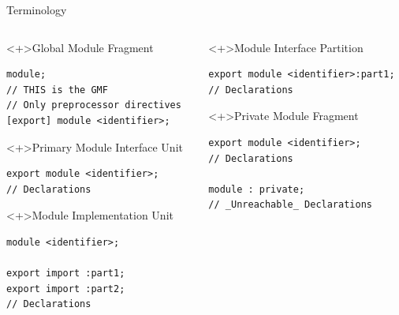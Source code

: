 \documentclass[aspectratio=169]{beamer}
\begin{document}

\begin{frame}[fragile]{Terminology}
  \begin{columns}
    \begin{column}{0.5\textwidth}

      \begin{block}<+>{\footnotesize Global Module Fragment}
        \begin{verbatim}
module;
// THIS is the GMF
// Only preprocessor directives
[export] module <identifier>;
    \end{verbatim}
      \end{block}

      \begin{block}<+>{\footnotesize Primary Module Interface Unit}
        \begin{verbatim}
export module <identifier>;
// Declarations
    \end{verbatim}
      \end{block}

      \begin{block}<+>{\footnotesize Module Implementation Unit}
        \begin{verbatim}
module <identifier>;

export import :part1;
export import :part2;
// Declarations
        \end{verbatim}
      \end{block}
    \end{column}

    \begin{column}{0.5\textwidth}

      \begin{block}<+>{\footnotesize Module Interface Partition}
        \begin{verbatim}
export module <identifier>:part1;
// Declarations
        \end{verbatim}
      \end{block}

      \begin{block}<+>{\footnotesize Private Module Fragment}
        \begin{verbatim}
export module <identifier>;
// Declarations

module : private;
// _Unreachable_ Declarations
        \end{verbatim}
      \end{block}

    \end{column}

  \end{columns}
\end{frame}
\end{document}
